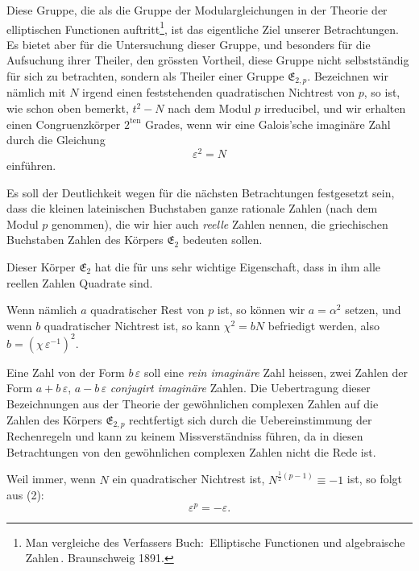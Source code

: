 \documentclass[12pt,a4paper]{article}
\begin{document}
Diese Gruppe, die als die Gruppe der Modulargleichungen in der Theorie der elliptischen Functionen auftritt\footnote{Man vergleiche des Verfassers Buch: \,Elliptische Functionen und algebraische Zahlen\,. Braunschweig 1891.}, ist das eigentliche Ziel unserer Betrachtungen. Es bietet aber für die Untersuchung dieser Gruppe, und besonders für die Aufsuchung ihrer Theiler, den grössten Vortheil, diese Gruppe nicht selbstständig für sich zu betrachten, sondern als Theiler einer Gruppe $\mathfrak{E}_{2,p}$. Bezeichnen wir nämlich mit $N$ irgend einen feststehenden quadratischen Nichtrest von $p$, so ist, wie schon oben bemerkt, $t^{2} - N$ nach dem Modul $p$ irreducibel, und wir erhalten einen Congruenzkörper $2^{\text{ten}}$ Grades, wenn wir eine Galois'sche imaginäre Zahl durch die Gleichung
\begin{equation}\label{eq:67.2}
\tag{2}
\varepsilon^{2} = N
\end{equation}
einführen.

Es soll der Deutlichkeit wegen für die nächsten Betrachtungen festgesetzt sein, dass die kleinen lateinischen Buchstaben ganze rationale Zahlen (nach dem Modul $p$ genommen), die wir hier auch \emph{reelle} Zahlen nennen, die griechischen Buchstaben Zahlen des Körpers $\mathfrak{E}_{2}$ bedeuten sollen.

Dieser Körper $\mathfrak{E}_{2}$ hat die für uns sehr wichtige Eigenschaft, dass in ihm alle reellen Zahlen Quadrate sind.

Wenn nämlich $a$ quadratischer Rest von $p$ ist, so können wir $a = \alpha^{2}$ setzen, und wenn $b$ quadratischer Nichtrest ist, so kann $\chi^{2} = bN$ befriedigt werden, also $b = (\chi\,\varepsilon^{-1})^{2}$.

\newpage
{}

Eine Zahl von der Form $b\,\varepsilon$ soll eine \emph{rein imaginäre} Zahl heissen, zwei Zahlen der Form $a + b\,\varepsilon$, $a - b\,\varepsilon$ \emph{conjugirt imaginäre} Zahlen. Die Uebertragung dieser Bezeichnungen aus der Theorie der gewöhnlichen complexen Zahlen auf die Zahlen des Körpers $\mathfrak{E}_{2,p}$ rechtfertigt sich durch die Uebereinstimmung der Rechenregeln und kann zu keinem Missverständniss führen, da in diesen Betrachtungen von den gewöhnlichen complexen Zahlen nicht die Rede ist.

Weil immer, wenn $N$ ein quadratischer Nichtrest ist, $N^{\frac{1}{2}(p-1)} \equiv -1$ ist, so folgt aus (2):
\begin{equation}\label{eq:67.3}
\tag{3}
\varepsilon^{p} = -\varepsilon.
\end{equation}
\end{document}

